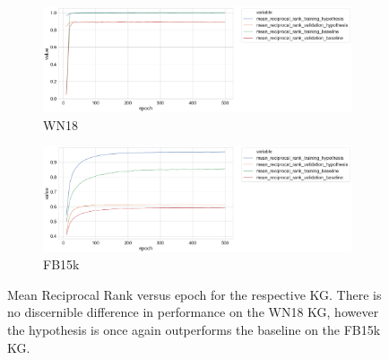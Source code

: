 
\begin{figure}
	\begin{subfigure}[b]{.5\linewidth}
   		\centering
    		\includegraphics[width=1.0\linewidth, height=0.6\linewidth]{WN18_mean_reciprocal_rank_Results}
		\captionsetup{justification=centering}
		\caption{WN18}
	\end{subfigure}
	\begin{subfigure}[b]{.5\linewidth}
   		\centering
		\includegraphics[width=1.0\linewidth, height=0.6\linewidth]{FB15k_mean_reciprocal_rank_Results}
		\captionsetup{justification=centering}
		\caption{FB15k}
	\end{subfigure}
	\caption{Mean Reciprocal Rank versus epoch for the respective KG. There is no discernible difference in performance on the WN18 KG, however the hypothesis is once again outperforms the baseline on the FB15k KG.}
\end{figure}



